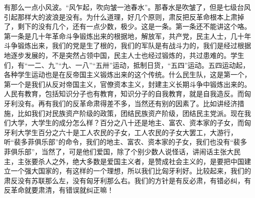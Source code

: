 有那么一点小风波。“风乍起，吹向皱一池春水”。那春水是吹皱了，但是七级台风引起那样大的波浪是没有。为什么道理，好几个原则，肃反把反革命根本上肃掉了，剩下的没有几个，还有一点少数，极少。这是一条。第一条还不能讲这个咯。第一条是几十年革命斗争锻炼出来的根据地，解放军，共产党，民主人士，几十年斗争锻炼出来，我们的党是生了根的，我们的军队是有战斗力的，我们是经过根据地逐步发展的，不是突然占领中国，民主人士也经过锻炼的，共过患难的。学生们，有“一二、九”“九、一八”“五卅”运动，抵制日货，“五四”运动。五四运动起，各种学生运动也是在反帝国主义锻炼出来的这个传统。什么民生队，这是第一个，第一个是我们从反对帝国主义，官僚资本主义，封建主义长期斗争中锻炼出来的。人民有教育，包括知识分子也有教育，知识分子的自我教育，就是自我造反。而匈牙利没有。再有我们的反革命肃得差不多，当然还有别的因素了。比如讲经济措施，比如我们对民族资产阶级的政策，团结民族资产阶级，团结民主党派。现在我们大学，大学生的成分怎么样？百分之八十还是地主、富农、资本家的子女，而匈牙利大学生百分之六十是工人农民的子女，工人农民的子女大罢工，大游行，听“裴多菲俱乐部”的命令，我们的地主、富农、资本家的子女，我们也没有“裴多菲俱乐部”，当然了，可是他们爱国，除了个别少数人说怪话，讲闹话主张大民主，主张要杀人之外，绝大多数是爱国主义者，是赞成社会主义的，是要把中国建立一个强大国家的，有这样的一个理想，所以我们比匈牙利好。比较起来，我们的肃反没有苏联那么左，没有匈牙利那么右。我们的方针是有反必肃，有错必纠，有反革命就要肃清，有错误就纠正嘛！

